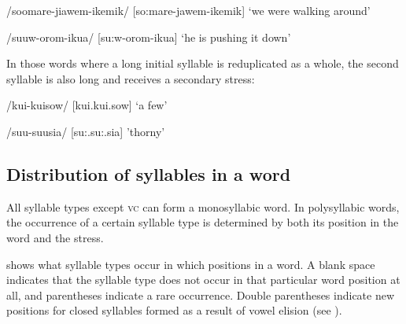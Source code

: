 /soomare-jiawem-ikemik/  [{{\textprimstress}so:mare-j}{\textsci}{{\textprimstress}}{{\textprimstress}}awem-i{{\textprimstress}}{{\textprimstress}}kemik]  `we were walking around'

/suuw-orom-ikua/  [{{\textprimstress}}su:w-o{{\textprimstress}}{{\textprimstress}}rom-i{{\textprimstress}}{{\textprimstress}}kua]  `he is pushing it down'

In those words where a long initial syllable is reduplicated as a whole, the second syllable is also long and receives a secondary stress:

/kui-kuisow/  [{{\textprimstress}}kui.{{\textprimstress}}{{\textprimstress}}kui.sow]  `a few'

/suu-suusia/  [{{\textprimstress}}su:.{{\textprimstress}}{{\textprimstress}}su:.sia]  'thorny'

\subsection{Distribution of syllables in a word}

All syllable types except  \textsc{vc} can form a monosyllabic word. In polysyllabic words, the occurrence of a certain syllable type is determined by both its position in the word and the stress. 

 shows what syllable types occur in which positions in a word.  A blank space indicates that the syllable type does not occur in that particular word position at all, and parentheses indicate a rare occurrence. Double parentheses indicate new positions for closed syllables formed as a result of vowel elision (see ). 



